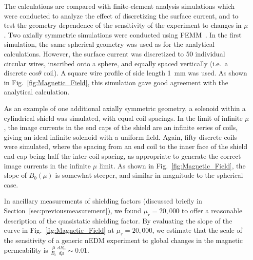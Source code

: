 The calculations are compared with finite-element analysis simulations
which were conducted to analyze the effect of discretizing the surface
current, and to test the geometry dependence of the sensitivity of the
experiment to changes in $\mu$.  Two axially symmetric simulations
were conducted using FEMM~\cite{bib:femm}.  In the first simulation,
the same spherical geometry was used as for the analytical
calculations.  However, the surface current was discretized to 50
individual circular wires, inscribed onto a sphere, and equally spaced
vertically (i.e.~a discrete cos$\theta$ coil).  A square wire profile
of side length 1~mm was used.  As shown in
Fig.~\ref{fig:Magnetic_Field}, this simulation gave good agreement
with the analytical calculation.

As an example of one additional axially symmetric geometry, a solenoid
within a cylindrical shield was simulated, with equal coil spacings.
In the limit of infinite $\mu$, the image currents in the end caps of
the shield are an infinite series of coils, giving an ideal infinite
solenoid with a uniform field.  Again, fifty discrete coils were
simulated, where the spacing from an end coil to the inner face of the
shield end-cap being half the inter-coil spacing, as appropriate to
generate the correct image currents in the infinite $\mu$ limit. 
As shown in Fig.~\ref{fig:Magnetic_Field}, the slope of $B_0(\mu)$ is
somewhat steeper, and similar in magnitude to the spherical case.

In ancillary measurements of shielding factors (discussed briefly in
Section~\ref{sec:previousmeasurement}), we found $\mu_r=20,000$ to
offer a reasonable description of the quasistatic shielding factor. By
evaluating the slope of the curve in Fig.~\ref{fig:Magnetic_Field} at
$\mu_r=20,000$, we estimate that the scale of the sensitivity of a
generic nEDM experiment to global changes in the magnetic permeability
is $\frac{\mu}{B_0}\frac{dB_0}{d\mu}\sim 0.01$.



